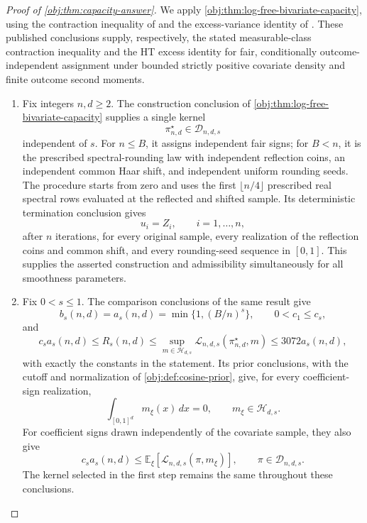 \documentclass[11pt]{article}
\begin{document}
\begin{proof}[Proof of \cref{obj:thm:capacity-answer}]
We apply \cref{obj:thm:log-free-bivariate-capacity}, using the contraction inequality of \citep[Theorem 12(4), with the complexity convention of Definition 2]{BartlettMendelson2002Complexities} and the excess-variance identity of \citep[Proposition 2.3, equation (2.4), under Assumption 2.1 and Definition 2.2]{Cytrynbaum2026Limits}. These published conclusions supply, respectively, the stated measurable-class contraction inequality and the HT excess identity for fair, conditionally outcome-independent assignment under bounded strictly positive covariate density and finite outcome second moments.

\begin{enumerate}
\item Fix integers \(n,d\geq2\). The construction conclusion of \cref{obj:thm:log-free-bivariate-capacity} supplies a single kernel
\[
\pi^\star_{n,d}\in\mathcal D_{n,d,s}
\]
independent of \(s\). For \(n\leq B\), it assigns independent fair signs; for \(B<n\), it is the prescribed spectral-rounding law with independent reflection coins, an independent common Haar shift, and independent uniform rounding seeds. The procedure starts from zero and uses the first \(\lfloor n/4\rfloor\) prescribed real spectral rows evaluated at the reflected and shifted sample. Its deterministic termination conclusion gives
\[
u_i=Z_i,\qquad i=1,\ldots,n,
\]
after \(n\) iterations, for every original sample, every realization of the reflection coins and common shift, and every rounding-seed sequence in \([0,1]\). This supplies the asserted construction and admissibility simultaneously for all smoothness parameters.

\item Fix \(0<s\leq1\). The comparison conclusions of the same result give
\[
b_s(n,d)=a_s(n,d)=\min\{1,(B/n)^s\},
\qquad
0<c_1\leq c_s,
\]
and
\[
c_sa_s(n,d)
\leq R_s(n,d)
\leq
\sup_{m\in\mathcal H_{d,s}}
\mathcal L_{n,d,s}(\pi^\star_{n,d},m)
\leq3072a_s(n,d),
\]
with exactly the constants in the statement. Its prior conclusions, with the cutoff and normalization of \cref{obj:def:cosine-prior}, give, for every coefficient-sign realization,
\[
\int_{[0,1]^d}m_\xi(x)\,dx=0,
\qquad
m_\xi\in\mathcal H_{d,s}.
\]
For coefficient signs drawn independently of the covariate sample, they also give
\[
c_sa_s(n,d)
\leq
\mathbb E_\xi\!\left[\mathcal L_{n,d,s}(\pi,m_\xi)\right],
\qquad
\pi\in\mathcal D_{n,d,s}.
\]
The kernel selected in the first step remains the same throughout these conclusions.


\end{enumerate}
\end{proof}
\end{document}

